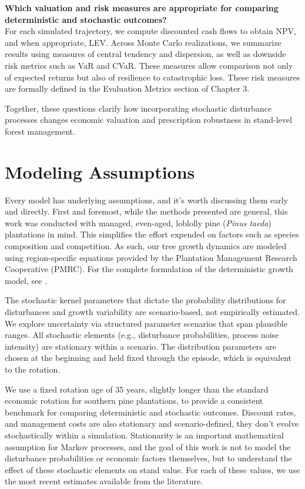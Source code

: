 \documentclass[12pt]{report}
\begin{document}
    \textbf{Which valuation and risk measures are appropriate for comparing deterministic and stochastic outcomes?} \\
    For each simulated trajectory, we compute discounted cash flows to obtain NPV, and when appropriate, LEV. Across Monte Carlo realizations, we summarize results using measures of central tendency and dispersion, as well as downside risk metrics such as VaR and CVaR. These measures allow comparison not only of expected returns but also of resilience to catastrophic loss. These risk measures are formally defined in the Evaluation Metrics section of Chapter 3.

Together, these questions clarify how incorporating stochastic disturbance processes changes economic valuation and prescription robustness in stand-level forest management.

\section{Modeling Assumptions}
Every model has underlying assumptions, and it's worth discussing them early and directly. First and foremost, while the methods presented are general, this work was conducted with managed, even-aged, loblolly pine (\textit{Pinus taeda}) plantations 
in mind. This simplifies the effort expended on factors such as species composition and competition. As such, our tree growth dynamics are modeled using region-specific equations provided by the Plantation Management Research Cooperative (PMRC). 
For the complete formulation of the deterministic growth model, see \textcite{pmrcHarrisonYieldPredictionGrowth1996}.

The stochastic kernel parameters that dictate the probability distributions for disturbances and growth variability are scenario-based, not empirically estimated. We explore uncertainty via structured parameter scenarios that span plausible ranges. All stochastic elements (e.g., disturbance probabilities, process noise intensity) are stationary within a scenario. The distribution parameters are chosen at the beginning and held fixed through the episode, which is equivalent to the rotation.

We use a fixed rotation age of 35 years, slightly longer than the standard economic rotation for southern pine plantations, to provide a consistent benchmark for comparing deterministic and stochastic outcomes. Discount rates, and management costs are also stationary and scenario-defined, they don’t evolve stochastically within a simulation. Stationarity is an important mathematical assumption for Markov processes, and the goal of this work is not to model the disturbance probabilities or economic factors themselves, but to understand the effect of these stochastic elements on stand value. For each of these values, we use the most recent estimates available from the literature.
\end{document}
